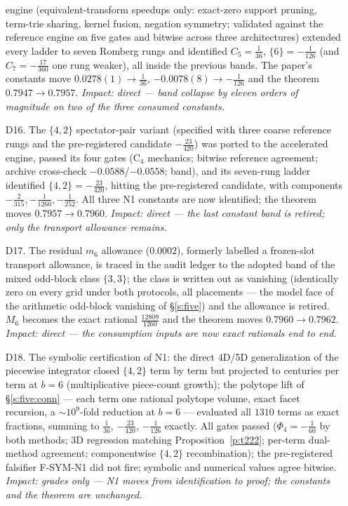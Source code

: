 \documentclass[11pt]{article}
\numberwithin{equation}{section}
\theoremstyle{definition}
\theoremstyle{remark}
\begin{document}
\begin{itemize}
engine (equivalent-transform speedups only: exact-zero support
pruning, term-trie sharing, kernel fusion, negation symmetry;
validated against the reference engine on five gates and
bitwise across three architectures) extended every ladder to
seven Romberg rungs and identified $C_5=\tfrac1{36}$,
$\{6\}=-\tfrac1{126}$ (and $C_7=-\tfrac{17}{360}$ one rung
weaker), all inside the previous bands. The paper's constants
move $0.0278(1)\to\tfrac1{36}$, $-0.0078(8)\to-\tfrac1{126}$
and the theorem $0.7947\to0.7957$. \emph{Impact: direct ---
band collapse by eleven orders of magnitude on two of the
three consumed constants.}
\item[D16.] The $\{4,2\}$ spectator-pair variant (specified
with three coarse reference rungs and the pre-registered
candidate $-\tfrac{23}{420}$) was ported to the accelerated
engine, passed its four gates (C$_4$ mechanics; bitwise
reference agreement; archive cross-check
$-0.0588$/$-0.0558$; band), and its seven-rung ladder
identified $\{4,2\}=-\tfrac{23}{420}$, hitting the
pre-registered candidate, with components
$-\tfrac2{315},-\tfrac1{1260},-\tfrac1{252}$. All three N1
constants are now identified; the theorem moves
$0.7957\to0.7960$. \emph{Impact: direct --- the last
constant band is retired; only the transport allowance
remains.}
\item[D17.] The residual $m_6$ allowance ($0.0002$), formerly
labelled a frozen-slot transport allowance, is traced in the
audit ledger to the adopted band of the mixed odd-block class
$\{3,3\}$; the class is written out as vanishing (identically
zero on every grid under both protocols, all placements ---
the model face of the arithmetic odd-block vanishing of
\S\ref{s:five}) and the allowance is retired. $M_6$ becomes
the exact rational $\tfrac{12809}{1260}$ and the theorem moves
$0.7960\to0.7962$. \emph{Impact: direct --- the consumption
inputs are now exact rationals end to end.}
\item[D18.] The symbolic certification of N1: the direct
4D/5D generalization of the piecewise integrator closed
$\{4,2\}$ term by term but projected to centuries per term at
$b=6$ (multiplicative piece-count growth); the polytope lift
of \S\ref{s:five:conn} --- each term one rational polytope
volume, exact facet recursion, a $\sim10^{9}$-fold reduction
at $b=6$ --- evaluated all $1310$ terms as exact fractions,
summing to $\tfrac1{36}$, $-\tfrac{23}{420}$, $-\tfrac1{126}$
exactly. All gates passed ($\Phi_4=-\tfrac1{60}$ by both
methods; 3D regression matching Proposition~\ref{p:t222};
per-term dual-method agreement; componentwise $\{4,2\}$
recombination); the pre-registered falsifier F-SYM-N1 did not
fire; symbolic and numerical values agree bitwise.
\emph{Impact: grades only --- N1 moves from identification to
proof; the constants and the theorem are unchanged.}
\end{itemize}
\end{document}
